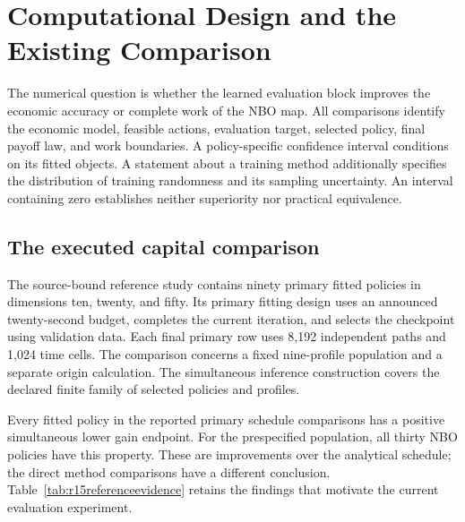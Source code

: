 \section{Computational Design and the Existing Comparison}\label{sec:r15design}
The numerical question is whether the learned evaluation block improves the economic accuracy or complete work of the NBO map. All comparisons identify the economic model, feasible actions, evaluation target, selected policy, final payoff law, and work boundaries. A policy-specific confidence interval conditions on its fitted objects. A statement about a training method additionally specifies the distribution of training randomness and its sampling uncertainty. An interval containing zero establishes neither superiority nor practical equivalence.

\subsection{The executed capital comparison}
The source-bound reference study contains ninety primary fitted policies in dimensions ten, twenty, and fifty. Its primary fitting design uses an announced twenty-second budget, completes the current iteration, and selects the checkpoint using validation data. Each final primary row uses 8,192 independent paths and 1,024 time cells. The comparison concerns a fixed nine-profile population and a separate origin calculation. The simultaneous inference construction covers the declared finite family of selected policies and profiles.

Every fitted policy in the reported primary schedule comparisons has a positive simultaneous lower gain endpoint. For the prespecified population, all thirty NBO policies have this property. These are improvements over the analytical schedule; the direct method comparisons have a different conclusion. Table~\ref{tab:r15referenceevidence} retains the findings that motivate the current evaluation experiment.

